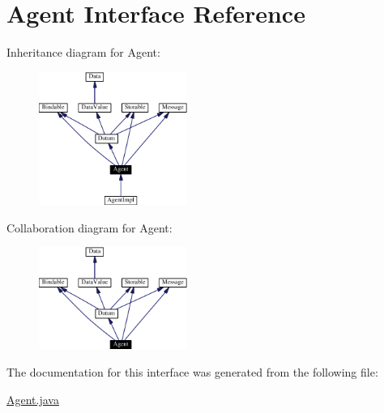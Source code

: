 \hypertarget{interfaceAgent}{
\section{Agent  Interface Reference}
\label{interfaceAgent}
}
Inheritance diagram for Agent:\begin{figure}[H]
\begin{center}
\leavevmode
\includegraphics[width=137pt]{interfaceAgent__inherit__graph}
\end{center}
\end{figure}
Collaboration diagram for Agent:\begin{figure}[H]
\begin{center}
\leavevmode
\includegraphics[width=137pt]{interfaceAgent__coll__graph}
\end{center}
\end{figure}


The documentation for this interface was generated from the following file:\begin{CompactItemize}
\item 
\hyperlink{Agent_8java-source}{Agent.java}\end{CompactItemize}
